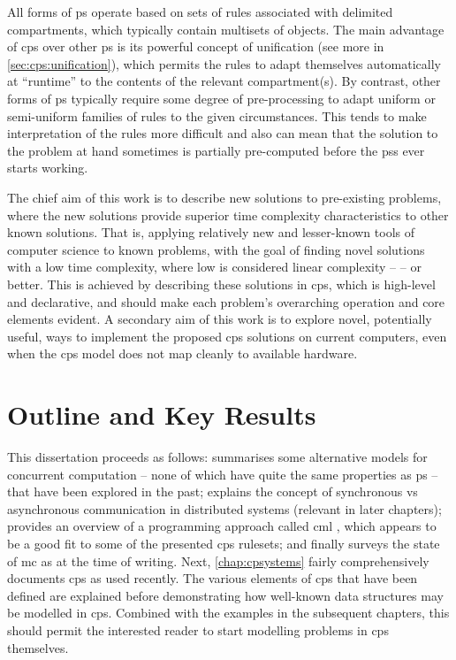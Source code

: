 All forms of \gls{ps} operate based on sets of rules associated with delimited \glspl{compartment}, which typically contain multisets of objects. The main advantage of \gls{cps} over other \gls{ps} is its powerful concept of unification (see more in \vref{sec:cps:unification}), which permits the rules to adapt themselves automatically at ``runtime'' to the contents of the relevant \gls{compartment}(s).  By contrast, other forms of \gls{ps} typically require some degree of pre-processing to adapt uniform or semi-uniform families of rules to the given circumstances.  This tends to make interpretation of the rules more difficult and also can mean that the solution to the problem at hand sometimes is partially pre-computed before the \glspl{ps} ever starts working.

The chief aim of this work is to describe new solutions to pre-existing problems, where the new solutions provide superior time complexity characteristics to other known solutions.  That is, applying relatively new and lesser-known tools of computer science to known problems, with the goal of finding novel solutions with a low time complexity, where low is considered linear complexity --  -- or better.  
This is achieved by describing these solutions in \gls{cps}, which is high-level and declarative, and should make each problem's overarching operation and core elements evident.
A secondary aim of this work is to explore novel, potentially useful, ways to implement the proposed \gls{cps} solutions on current computers, even when the \gls{cps} model does not map cleanly to available hardware.  

\section{Outline and Key Results}

This dissertation proceeds as follows:  summarises some alternative models for concurrent computation -- none of which have quite the same properties as \gls{ps} -- that have been explored in the past;  explains the concept of synchronous vs asynchronous communication in distributed systems (relevant in later chapters);  provides an overview of a programming approach called \gls{cml} \cite{Reppy2007,Reppy1991}, which appears to be a good fit to some of the presented \gls{cps} \glspl{ruleset}; and finally surveys the state of \gls{mc} as at the time of writing.  Next, \cref{chap:cpsystems} fairly comprehensively documents \gls{cps} as used recently.  The various elements of \gls{cps} that have been defined are explained before demonstrating how well-known data structures may be modelled in \gls{cps}.  Combined with the examples in the subsequent chapters, this should permit the interested reader to start modelling problems in \gls{cps} themselves.

